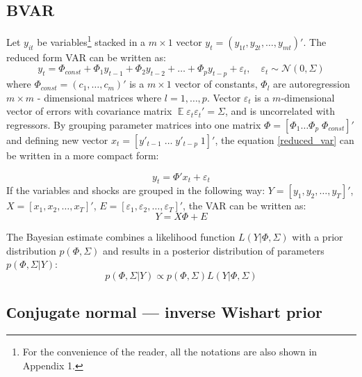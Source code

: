 \documentclass[12pt]{article} %
\DeclareMathOperator{\E}{\mathbb{E}}
\newcommand{\cN}{\mathcal{N}}
\let\vec\relax
\DeclareMathOperator{\vec}{vec}
\begin{document}
\subsection{BVAR}
Let $y_{it}$ be variables\footnote{For the convenience of the reader, all the notations are also shown in Appendix 1.} stacked in a  $m\times 1$ vector $y_{t}=(y_{1t},y_{2t},\ldots, y_{mt})'$. The reduced form VAR can be written as:
\begin{equation}
y_t =\Phi_{const}+ \Phi_1 y_{t-1} + \Phi_2 y_{t-2} +\ldots + \Phi_p y_{t-p} + \varepsilon_t,\quad \varepsilon_t\sim \cN(0,\Sigma)\label{reduced_var}
\end{equation}
where $\Phi_{const}=(c_1,\ldots ,c_m)'$ is a $m\times 1$  vector of constants, $\Phi_l$ are autoregression   $m\times m$ - dimensional matrices where $l=1, \ldots, p$. Vector $\varepsilon_t$ is a $m$-dimensional vector of errors with  covariance matrix $\E\varepsilon_t \varepsilon _t'=\Sigma$, and is uncorrelated with regressors.
By grouping parameter matrices into one matrix  $\Phi=[\Phi_1 \ldots \Phi_p \; \Phi_{const}]'$ %
and defining new vector $x_t=[ y'_{t-1}\;  \ldots  \; y'_{t-p} \; 1]'$, the equation \eqref{reduced_var} can be written in a more compact form:

\begin{equation}
y_t=\Phi' x_t+\varepsilon_t
\end{equation}
If the variables and shocks are grouped in the following way: $Y=[y_1, y_2,\ldots, y_T]'$, $X=[x_1, x_2,\ldots, x_T]'$, $E=[\varepsilon_1, \varepsilon_2,\ldots, \varepsilon_T]'$, the VAR can be written as:
\begin{equation}
Y=X\Phi+E\label{var}
\end{equation}


The Bayesian estimate combines a likelihood function $L(Y|\Phi, \Sigma)$ with a prior distribution $p(\Phi, \Sigma)$ and results in a posterior distribution of parameters $p(\Phi, \Sigma|Y)$: %
\begin{equation}
p(\Phi, \Sigma|Y)\propto p(\Phi,\Sigma) L(Y|\Phi,\Sigma)
\end{equation}


\subsection{Сonjugate normal --- inverse Wishart prior}
\end{document}
